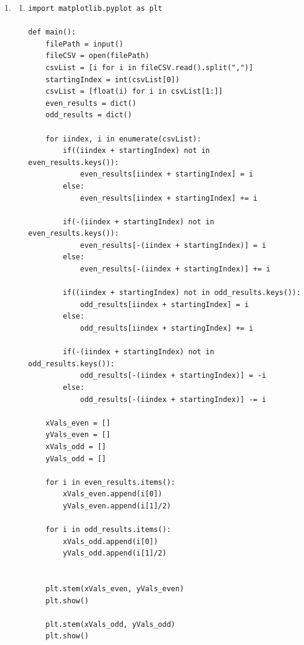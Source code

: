 \documentclass[10pt,a4paper, margin=1in]{article}
\begin{document}
\begin{enumerate}
    \item %
          \begin{enumerate}
                \item %
                 \lstset{language=Python}
                    \lstset{frame=single}
                    \lstset{basicstyle=\footnotesize}
                    \begin{lstlisting}
import matplotlib.pyplot as plt

def main():
    filePath = input()
    fileCSV = open(filePath)
    csvList = [i for i in fileCSV.read().split(",")]
    startingIndex = int(csvList[0])
    csvList = [float(i) for i in csvList[1:]]
    even_results = dict()
    odd_results = dict()
    
    for iindex, i in enumerate(csvList):
        if((iindex + startingIndex) not in even_results.keys()):
            even_results[iindex + startingIndex] = i
        else:
            even_results[iindex + startingIndex] += i
        
        if(-(iindex + startingIndex) not in even_results.keys()):
            even_results[-(iindex + startingIndex)] = i
        else:
            even_results[-(iindex + startingIndex)] += i
        
        if((iindex + startingIndex) not in odd_results.keys()):
            odd_results[iindex + startingIndex] = i
        else:
            odd_results[iindex + startingIndex] += i
        
        if(-(iindex + startingIndex) not in odd_results.keys()):
            odd_results[-(iindex + startingIndex)] = -i
        else:
            odd_results[-(iindex + startingIndex)] -= i
        
    xVals_even = []
    yVals_even = []
    xVals_odd = []
    yVals_odd = []

    for i in even_results.items():
        xVals_even.append(i[0])
        yVals_even.append(i[1]/2)
    
    for i in odd_results.items():
        xVals_odd.append(i[0])
        yVals_odd.append(i[1]/2)
    

    plt.stem(xVals_even, yVals_even)
    plt.show()

    plt.stem(xVals_odd, yVals_odd)
    plt.show()


\end{lstlisting}
\end{enumerate}
\end{enumerate}
\end{document}

